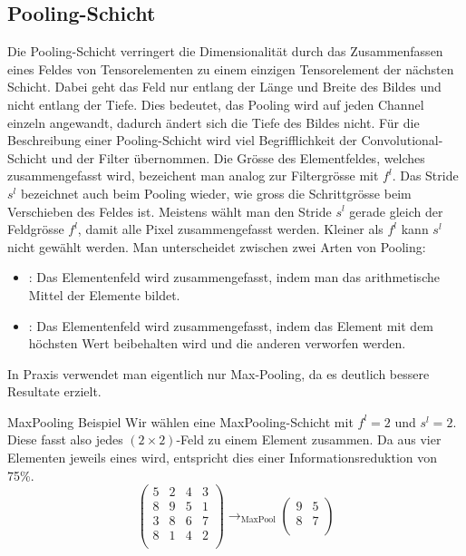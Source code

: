 \subsection{Pooling-Schicht}
Die Pooling-Schicht verringert die Dimensionalität durch das Zusammenfassen eines Feldes
von Tensorelementen zu einem einzigen Tensorelement der nächsten Schicht.
Dabei geht das Feld nur entlang der Länge und Breite des Bildes und
nicht entlang der Tiefe. Dies bedeutet, das Pooling wird auf jeden Channel
einzeln angewandt, dadurch ändert sich die Tiefe des Bildes nicht.
\para{}
Für die Beschreibung einer Pooling-Schicht wird viel Begrifflichkeit der
Convolutional-Schicht und der Filter übernommen.
Die Grösse des Elementfeldes, welches zusammengefasst wird, bezeichent man analog zur
Filtergrösse mit $f^l$. Das Stride $s^l$ bezeichnet auch beim Pooling wieder, wie
gross die Schrittgrösse beim Verschieben des Feldes ist. Meistens wählt man den
Stride $s^l$ gerade gleich der Feldgrösse $f^l$, damit alle Pixel
zusammengefasst werden. Kleiner als $f^l$ kann $s^l$ nicht gewählt werden.
\para{}
Man unterscheidet zwischen zwei Arten von Pooling:
\begin{itemize}
\item{: Das Elementenfeld wird zusammengefasst, indem
    man das arithmetische Mittel der Elemente bildet.}
\item{: Das Elementenfeld wird zusammengefasst, indem das
    Element mit dem höchsten Wert beibehalten wird und die anderen verworfen werden.}
\end{itemize}
In Praxis verwendet man eigentlich nur Max-Pooling, da es deutlich bessere
Resultate erzielt.
\begin{examplebox}{MaxPooling Beispiel}
  Wir wählen eine MaxPooling-Schicht mit $f^l = 2$ und $s^l = 2$.
  Diese fasst also jedes $(2 \times 2)$-Feld zu einem Element zusammen. Da aus
  vier Elementen jeweils eines wird, entspricht dies einer Informationsreduktion
  von 75\%.
  \para{}
  \begin{equation*}
    \begin{pmatrix}
      5 & 2 & 4 & 3 \\
      8 & 9 & 5 & 1 \\
      3 & 8 & 6 & 7 \\
      8 & 1 & 4 & 2 \\
    \end{pmatrix}
    \to_{\text{MaxPool}}
    \begin{pmatrix}
      9 & 5 \\
      8 & 7 \\
    \end{pmatrix}
  \end{equation*}
\end{examplebox}

